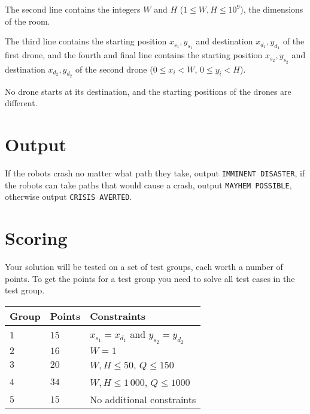 The second line contains the integers $W$ and $H$ ($1 \le W, H \le 10^9$), the dimensions of the room.

The third line contains the starting position $x_{s_1}, y_{s_1}$ and destination $x_{d_1}, y_{d_1}$ of the first drone,
and the fourth and final line contains the starting position $x_{s_2}, y_{s_2}$ and destination $x_{d_2}, y_{d_2}$ of the second drone ($0 \le x_i < W$, $0 \le y_i < H$).

No drone starts at its destination, and the starting positions of the drones are different.

\section*{Output}
If the robots crash no matter what path they take, output \texttt{IMMINENT DISASTER},
if the robots can take paths that would cause a crash, output \texttt{MAYHEM POSSIBLE},
otherwise output \texttt{CRISIS AVERTED}.

\section*{Scoring}
Your solution will be tested on a set of test groups, each worth a number of points.
To get the points for a test group you need to solve all test cases in the test group.

\noindent
\begin{tabular}{| l | l | l |}
  \hline
  Group & Points & Constraints \\ \hline
  $1$    & $15$         &  $x_{s_1} = x_{d_1}$ and $y_{s_2} = y_{d_2}$ \\ \hline
  $2$    & $16$        &  $W = 1$ \\ \hline
  $3$    & $20$        &  $W, H \le 50$, $Q \le 150$ \\ \hline
  $4$    & $34$        &  $W, H \le 1\,000$, $Q \le 1000$ \\ \hline
  $5$    & $15$        &  No additional constraints \\ \hline
\end{tabular}
